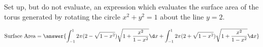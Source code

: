 \documentclass{ximera}
\author{Steven Gubkin}
\begin{document}
\begin{exercise}


Set up, but do not evaluate, an expression which evaluates the surface area of the torus generated by rotating the circle $x^2+y^2=1$ about the line $y = 2$.

\begin{prompt}
	\[
	\textrm{Surface Area} = \answer{\int_{-1}^{1} 2\pi(2-\sqrt{1-x^2}) \sqrt{1+\frac{x^2}{1-x^2}}  \d x + \int_{-1}^{1} 2\pi(2+\sqrt{1-x^2}) \sqrt{1+\frac{x^2}{1-x^2}}  \d x }
	\]
\end{prompt}

\end{exercise}
\end{document}
